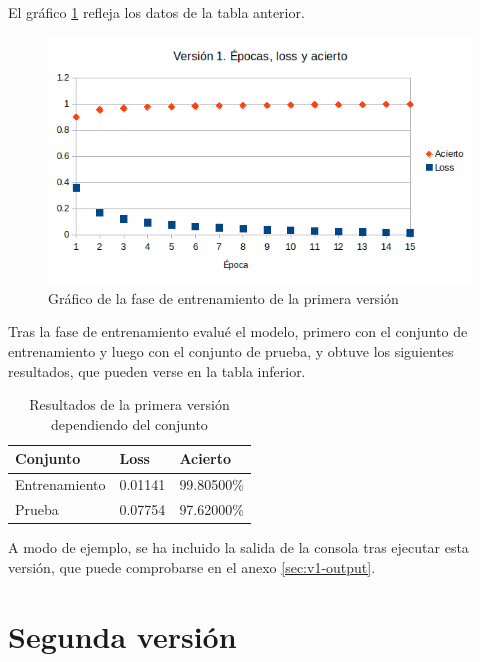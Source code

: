\bigskip

El gráfico \ref{fig:res-v1} refleja los datos de la tabla anterior.

\bigskip

\begin{figure}[H]
  \centering
  \includegraphics[width=1\textwidth]{../images/results-v1}
  \caption{Gráfico de la fase de entrenamiento de la primera versión}
  \label{fig:res-v1}
\end{figure}

\bigskip

Tras la fase de entrenamiento evalué el modelo, primero con el conjunto de entrenamiento y luego con el conjunto de prueba, y obtuve los siguientes resultados, que pueden verse en la tabla inferior.

\bigskip

\begin{table}[H]
  \centering
  \begin{tabular}{|l|l|l|}
    \hline
    \textbf{Conjunto} & \textbf{Loss} & \textbf{Acierto} \\
    \hline
    Entrenamiento & 0.01141 & 99.80500\%  \\
    Prueba        & 0.07754 & 97.62000\%  \\
    \hline
  \end{tabular}
  \label{tab:results-v1}
  \caption{Resultados de la primera versión dependiendo del conjunto}
\end{table}

\bigskip

A modo de ejemplo, se ha incluido la salida de la consola tras ejecutar esta versión, que puede comprobarse en el  anexo \ref{sec:v1-output}.

\section{Segunda versión}

